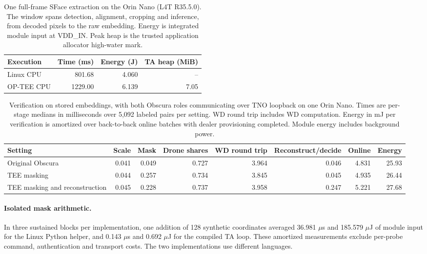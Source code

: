 \begin{table}[t]
\centering
\caption{One full-frame SFace extraction on the Orin Nano (L4T R35.5.0).
The window spans detection, alignment, cropping and inference, from decoded
pixels to the raw embedding. Energy is integrated module input at VDD\_IN.
Peak heap is the trusted application allocator high-water mark.}
\label{tab:obscura-sface-jetson}
\begin{tabular}{lrrr}
\hline
Execution & Time (ms) & Energy (J) & TA heap (MiB) \\
\hline
Linux CPU & 801.68 & 4.060 & -- \\
OP-TEE CPU & 1229.00 & 6.139 & 7.05 \\
\hline
\end{tabular}
\end{table}

\begin{table}[t]
\centering
\caption{Verification on stored embeddings, with both Obscura roles communicating
over TNO loopback on one Orin Nano. Times are per-stage medians in milliseconds
over 5,092 labeled pairs per setting. WD round trip includes WD computation.
Energy in mJ per verification is amortized over back-to-back online batches with
dealer provisioning completed. Module energy includes background power.}
\label{tab:obscura-verify-jetson}
\begin{tabular}{lrrrrrrr}
\hline
Setting & Scale & Mask & Drone shares & WD round trip & Reconstruct/decide & Online & Energy \\
\hline
Original Obscura & 0.041 & 0.049 & 0.727 & 3.964 & 0.046 & 4.831 & 25.93 \\
TEE masking & 0.044 & 0.257 & 0.734 & 3.845 & 0.045 & 4.935 & 26.44 \\
TEE masking and reconstruction & 0.045 & 0.228 & 0.737 & 3.958 & 0.247 & 5.221 & 27.68 \\
\hline
\end{tabular}
\end{table}

\paragraph{Isolated mask arithmetic.} In three sustained blocks per implementation, one addition of 128 synthetic coordinates averaged 36.981 $\mu$s and 185.579 $\mu$J of module input for the Linux Python helper, and 0.143 $\mu$s and 0.692 $\mu$J for the compiled TA loop. These amortized measurements exclude per-probe command, authentication and transport costs. The two implementations use different languages.

